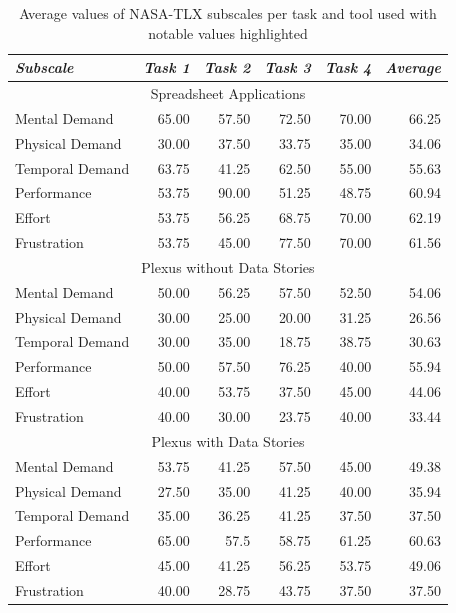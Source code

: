 \documentclass{sigchi}
\begin{document}
\begin{table}[]
\small
\begin{tabular}{lrrrrr}
\toprule
{\small\textit{Subscale}}
& {\small \textit{Task 1}}
& {\small \textit{Task 2}}
& {\small \textit{Task 3}} 
& {\small \textit{Task 4}}
& {\small \textit{Average}} \\
\midrule
\multicolumn{6}{c}{Spreadsheet Applications}                 \\
\midrule
Mental Demand   & 65.00     & 57.50   & 72.50 & 70.00  & \cellcolor[rgb]{0.78,0.78,0.78} 66.25  \\
Physical Demand & 30.00     & 37.50   & 33.75  & 35.00   & 34.06 \\
Temporal Demand & 63.75  & 41.25  & 62.50   & 55.00     & 55.63  \\
Performance     & 53.75  & 90.00     & 51.25  & 48.75  & 60.94 \\
Effort          & 53.75  & 56.25  & 68.75  & 70.00     & 62.19 \\
Frustration     & 53.75  & 45.00     & 77.50   & 70.00   & 61.56 \\
\midrule
\multicolumn{6}{c}{Plexus without Data Stories}                      \\
\midrule
Mental Demand   & 50.00  & 56.25  & 57.50  & 52.50  & \cellcolor[rgb]{0.78,0.78,0.78} 54.06   \\
Physical Demand & 30.00  & 25.00  & 20.00  & 31.25  & 26.56   \\
Temporal Demand & 30.00  & 35.00  & 18.75  & 38.75  & 30.63   \\
Performance     & 50.00  & 57.50  & 76.25  & 40.00  & \cellcolor[rgb]{0.78,0.78,0.78} 55.94   \\
Effort          & 40.00  & 53.75  & 37.50  & 45.00  & 44.06   \\
Frustration     & 40.00  & 30.00  & 23.75  & 40.00  & \cellcolor[rgb]{0.78,0.78,0.78} 33.44   \\
\midrule
\multicolumn{6}{c}{Plexus with Data Stories}                         \\
\midrule
Mental Demand   & 53.75  & 41.25  & 57.50  & 45.00 & 49.38  \\
Physical Demand & 27.50   & 35.00     & 41.25  & 40.00  & 35.94 \\
Temporal Demand & 35.00     & 36.25  & 41.25  & 37.50 & 37.50    \\
Performance     & 65.00     & 57.5   & 58.75  & 61.25  & \cellcolor[rgb]{0.78,0.78,0.78} 60.63  \\
Effort          & 45.00     & 41.25  & 56.25  & 53.75  & 49.06 \\
Frustration     & 40.00     & 28.75  & 43.75  & 37.50   & 37.50  \\ 
\bottomrule
\end{tabular}
\caption{Average values of NASA-TLX subscales per task and tool used with notable values highlighted}~\label{tab:tlx}
\end{table}
\end{document}
